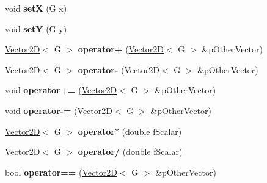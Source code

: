 \begin{DoxyCompactItemize}
\item 
\hypertarget{class_vector2_d_a6c5526343de1af297d3cc4baca03a9b1}{}void {\bfseries set\+X} (G x)\label{class_vector2_d_a6c5526343de1af297d3cc4baca03a9b1}

\item 
\hypertarget{class_vector2_d_ac7ba076a26efb04c2e590a0cdd3fd20e}{}void {\bfseries set\+Y} (G y)\label{class_vector2_d_ac7ba076a26efb04c2e590a0cdd3fd20e}

\item 
\hypertarget{class_vector2_d_ad571f44f13b020b74f441503b6bf7425}{}\hyperlink{class_vector2_d}{Vector2\+D}$<$ G $>$ {\bfseries operator+} (\hyperlink{class_vector2_d}{Vector2\+D}$<$ G $>$ \&p\+Other\+Vector)\label{class_vector2_d_ad571f44f13b020b74f441503b6bf7425}

\item 
\hypertarget{class_vector2_d_a8ff9c277a0e44773a6e805c503d633b3}{}\hyperlink{class_vector2_d}{Vector2\+D}$<$ G $>$ {\bfseries operator-\/} (\hyperlink{class_vector2_d}{Vector2\+D}$<$ G $>$ \&p\+Other\+Vector)\label{class_vector2_d_a8ff9c277a0e44773a6e805c503d633b3}

\item 
\hypertarget{class_vector2_d_ac7e988225c010045df597cb7a6001117}{}void {\bfseries operator+=} (\hyperlink{class_vector2_d}{Vector2\+D}$<$ G $>$ \&p\+Other\+Vector)\label{class_vector2_d_ac7e988225c010045df597cb7a6001117}

\item 
\hypertarget{class_vector2_d_a49cd9a9980f36936bb6713ac53592832}{}void {\bfseries operator-\/=} (\hyperlink{class_vector2_d}{Vector2\+D}$<$ G $>$ \&p\+Other\+Vector)\label{class_vector2_d_a49cd9a9980f36936bb6713ac53592832}

\item 
\hypertarget{class_vector2_d_a8bd1a6f5a8df8670a27fe8edb5d9ec54}{}\hyperlink{class_vector2_d}{Vector2\+D}$<$ G $>$ {\bfseries operator$\ast$} (double f\+Scalar)\label{class_vector2_d_a8bd1a6f5a8df8670a27fe8edb5d9ec54}

\item 
\hypertarget{class_vector2_d_aac1986fafb802574b20fdd2451786fbc}{}\hyperlink{class_vector2_d}{Vector2\+D}$<$ G $>$ {\bfseries operator/} (double f\+Scalar)\label{class_vector2_d_aac1986fafb802574b20fdd2451786fbc}

\item 
\hypertarget{class_vector2_d_ac876ccd00b2e92c0533e57a80c90493c}{}bool {\bfseries operator==} (\hyperlink{class_vector2_d}{Vector2\+D}$<$ G $>$ \&p\+Other\+Vector)\label{class_vector2_d_ac876ccd00b2e92c0533e57a80c90493c}

\end{DoxyCompactItemize}



